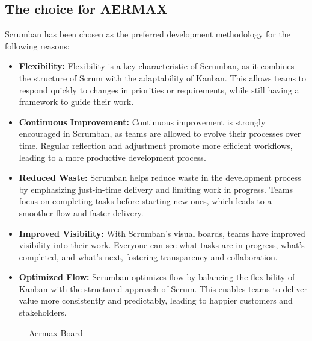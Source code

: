 \subsection{The choice for AERMAX}
Scrumban has been chosen as the preferred development methodology for the following reasons:
\begin{itemize}
    \item \textbf{Flexibility:} Flexibility is a key characteristic of Scrumban, as it combines the structure of Scrum with the adaptability of Kanban. This allows teams to respond quickly to changes in priorities or requirements, while still having a framework to guide their work.
    \item \textbf{Continuous Improvement:} Continuous improvement is strongly encouraged in Scrumban, as teams are allowed to evolve their processes over time. Regular reflection and adjustment promote more efficient workflows, leading to a more productive development process.
    \item \textbf{Reduced Waste:} Scrumban helps reduce waste in the development process by emphasizing just-in-time delivery and limiting work in progress. Teams focus on completing tasks before starting new ones, which leads to a smoother flow and faster delivery.
    \item \textbf{Improved Visibility:} With Scrumban's visual boards, teams have improved visibility into their work. Everyone can see what tasks are in progress, what's completed, and what's next, fostering transparency and collaboration.
    \item \textbf{Optimized Flow:} Scrumban optimizes flow by balancing the flexibility of Kanban with the structured approach of Scrum. This enables teams to deliver value more consistently and predictably, leading to happier customers and stakeholders.
\end{itemize}

\begin{figure}[H]
    \centering
    \caption{Aermax Board}
    \label{fig:armax-board}
\end{figure}
 
